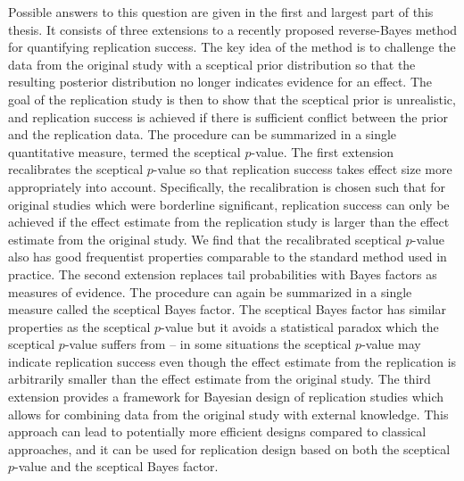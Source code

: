 Possible answers to this question are given in the first and largest part of
this thesis. It consists of three extensions to a recently proposed
reverse-Bayes method for quantifying replication success. The key idea of the
method is to challenge the data from the original study with a sceptical prior
distribution so that the resulting posterior distribution no longer indicates
evidence for an effect. The goal of the replication study is then to show that
the sceptical prior is unrealistic, and replication success is achieved if there
is sufficient conflict between the prior and the replication data. The procedure
can be summarized in a single quantitative measure, termed the sceptical
$p$-value.
The first extension recalibrates the sceptical $p$-value so that replication
success takes effect size more appropriately into account. Specifically, the
recalibration is chosen such that for original studies which were borderline
significant, replication success can only be achieved if the effect estimate
from the replication study is larger than the effect estimate from the original
study. We find that the recalibrated sceptical $p$-value also has good
frequentist properties comparable to the standard method used in practice.
The second extension replaces tail probabilities with Bayes factors as measures
of evidence. The procedure can again be summarized in a single measure called
the sceptical Bayes factor.
The sceptical Bayes factor has similar properties as the sceptical $p$-value but
it avoids a statistical paradox which the sceptical $p$-value suffers from -- in
some situations the sceptical $p$-value may indicate replication success even
though the effect estimate from the replication is arbitrarily smaller than the
effect estimate from the original study. %
The third extension provides a framework for Bayesian design of replication
studies which allows for combining data from the original study with external
knowledge. This approach can lead to potentially more efficient designs compared
to classical approaches, and it can be used for replication design based on both
the sceptical $p$-value and the sceptical Bayes factor.

